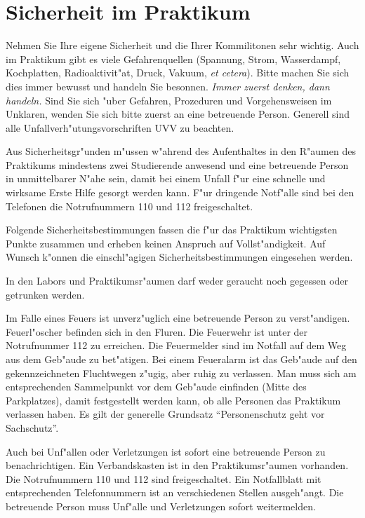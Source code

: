 
\chapter{Sicherheit im Praktikum} \label{v:sicherheit}

Nehmen Sie Ihre eigene Sicherheit und die Ihrer
Kommilitonen sehr wichtig. Auch im Praktikum gibt es viele
Gefahrenquellen (Spannung, Strom, Wasserdampf, Kochplatten, Radioaktivit"at, Druck, Vakuum, \emph{et
cetera}). Bitte machen Sie sich dies immer bewusst und handeln Sie
besonnen. \emph{Immer zuerst denken, dann handeln.} Sind Sie sich
"uber Gefahren, Prozeduren und Vorgehensweisen im Unklaren, wenden
Sie sich bitte zuerst an eine betreuende Person. Generell sind alle
Unfallverh"utungsvorschriften \textsc{UVV} zu beachten.

Aus Sicherheitsgr"unden m"ussen w"ahrend des Aufenthaltes in den R"aumen
des Praktikums mindestens zwei Studierende anwesend und eine
betreuende Person in unmittelbarer N"ahe sein, damit bei einem Unfall
f"ur eine schnelle und wirksame Erste Hilfe
gesorgt werden kann. F"ur dringende Notf"alle sind bei
den Telefonen die Notrufnummern 110 und 112
freigeschaltet.

Folgende Sicherheitsbestimmungen fassen die f"ur das Praktikum
wichtigsten Punkte zusammen und erheben keinen Anspruch auf
Vollst"andigkeit. Auf Wunsch k"onnen die einschl"agigen
Sicherheitsbestimmungen eingesehen werden.

In den Labors und Praktikumsr"aumen darf weder geraucht noch
gegessen oder getrunken werden.

Im Falle eines Feuers ist unverz"uglich eine
betreuende Person zu verst"andigen. Feuerl"oscher befinden sich in
den Fluren. Die Feuerwehr ist unter der Notrufnummer 112 zu
erreichen. Die Feuermelder sind im Notfall auf dem Weg aus dem
Geb"aude zu bet"atigen. Bei einem Feueralarm ist das Geb"aude auf den
gekennzeichneten Fluchtwegen z"ugig, aber ruhig zu verlassen. Man
muss sich am entsprechenden Sammelpunkt vor dem
Geb"aude einfinden (Mitte des Parkplatzes), damit festgestellt
werden kann, ob alle Personen das Praktikum verlassen haben. Es
gilt der generelle Grundsatz "`Personenschutz geht vor
Sachschutz"'.

Auch bei Unf"allen oder Verletzungen ist sofort eine
betreuende Person zu benachrichtigen. Ein Verbandskasten ist in
den Praktikumsr"aumen vorhanden. Die Notrufnummern 110 und 112 sind
freigeschaltet. Ein Notfallblatt mit entsprechenden Telefonnummern
ist an verschiedenen Stellen ausgeh"angt. Die betreuende Person
muss Unf"alle und Verletzungen sofort weitermelden.

